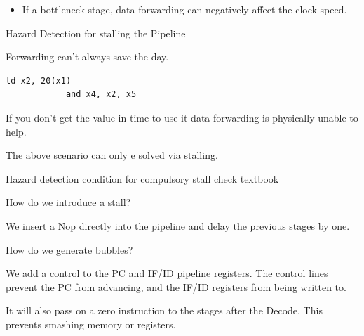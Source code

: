 \documentclass{report}
\begin{document}
\begin{description}
\begin{itemize}
            \item If a bottleneck stage, data forwarding can
                negatively affect the clock speed. 
        \end{itemize}

    \item Hazard Detection for stalling the Pipeline
        \begin{mdframed}
            Forwarding can't always save the day.
            \begin{lstlisting}[language={[x86asm]Assembler}]
            ld x2, 20(x1)
            and x4, x2, x5
            \end{lstlisting}

            If you don't get the value in time to use it
            data forwarding is physically unable to help.

            The above scenario can only e solved via stalling.
        \end{mdframed}
        \begin{mdframed}
            Hazard detection condition for compulsory stall
            check textbook
        \end{mdframed}

        \begin{mdframed}
            How do we introduce a stall?

            We insert a Nop directly into the pipeline
            and delay the previous stages by one.

            \vspace{10}

            How do we generate bubbles?

            We add a control to the PC and IF/ID pipeline registers.
            The control lines prevent the PC from advancing, and the
            IF/ID registers from being written to.

            It will also pass on a zero instruction to the stages
            after the Decode. This prevents smashing memory or
            registers.
        \end{mdframed}

    

\end{description}
\end{document}
